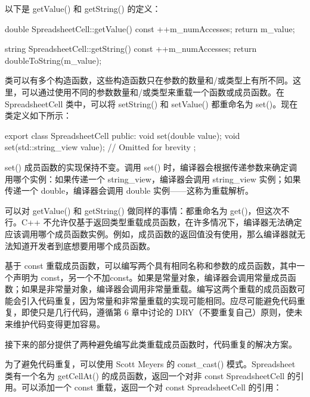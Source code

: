 以下是 getValue() 和 getString() 的定义：

\begin{cpp}
double SpreadsheetCell::getValue() const
{
    ++m_numAccesses;
    return m_value;
}

string SpreadsheetCell::getString() const
{
    ++m_numAccesses;
    return doubleToString(m_value);
}
\end{cpp}


类可以有多个构造函数，这些构造函数只在参数的数量和/或类型上有所不同。这里，可以通过使用不同的参数数量和/或类型来重载一个函数或成员函数。在 SpreadsheetCell 类中，可以将 setString() 和 setValue() 都重命名为 set()。现在类定义如下所示：

\begin{cpp}
export class SpreadsheetCell
{
    public:
        void set(double value);
        void set(std::string_view value);
        // Omitted for brevity
};
\end{cpp}

set() 成员函数的实现保持不变。调用 set() 时，编译器会根据传递参数来确定调用哪个实例：如果传递一个 string\_view，编译器会调用 string\_view 实例；如果传递一个 double，编译器会调用 double 实例——这称为重载解析。

可以对 getValue() 和 getString() 做同样的事情：都重命名为 get()，但这次不行。C++ 不允许仅基于返回类型重载成员函数，在许多情况下，编译器无法确定应该调用哪个成员函数实例。例如，成员函数的返回值没有使用，那么编译器就无法知道开发者到底想要用哪个成员函数。


基于 const 重载成员函数，可以编写两个具有相同名称和参数的成员函数，其中一个声明为 const，另一个不加const。如果是常量对象，编译器会调用常量成员函数；如果是非常量对象，编译器会调用非常量重载。编写这两个重载的成员函数可能会引入代码重复，因为常量和非常量重载的实现可能相同。应尽可能避免代码重复，即使只是几行代码，遵循第 6 章中讨论的 DRY（不要重复自己）原则，使未来维护代码变得更加容易。

接下来的部分提供了两种避免编写此类重载成员函数时，代码重复的解决方案。


为了避免代码重复，可以使用 Scott Meyers 的 const\_cast() 模式。Spreadsheet 类有一个名为 getCellAt() 的成员函数，返回一个对非 const SpreadsheetCell 的引用。可以添加一个 const 重载，返回一个对 const SpreadsheetCell 的引用：

